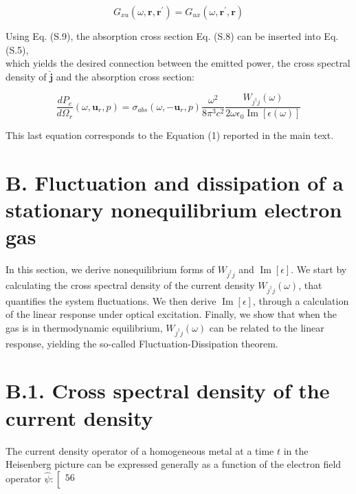 \documentclass[10pt]{article}
\begin{document}
\begin{equation*}
G_{x u}\left(\omega, \boldsymbol{r}, \boldsymbol{r}^{\prime}\right)=G_{u x}\left(\omega, \boldsymbol{r}^{\prime}, \boldsymbol{r}\right) \tag{S.9}
\end{equation*}


Using Eq. (S.9), the absorption cross section Eq. (S.8) can be inserted into Eq. (S.5),\\
which yields the desired connection between the emitted power, the cross spectral density of $\hat{\boldsymbol{j}}$ and the absorption cross section:


\begin{equation*}
\frac{d P_{e}}{d \Omega_{r}}\left(\omega, \boldsymbol{u}_{r}, p\right)=\sigma_{a b s}\left(\omega,-\boldsymbol{u}_{r}, p\right) \frac{\omega^{2}}{8 \pi^{3} c^{2}} \frac{W_{j^{\dagger} j}(\omega)}{2 \omega \epsilon_{0} \operatorname{Im}[\epsilon(\omega)]} \tag{S.10}
\end{equation*}


This last equation corresponds to the Equation (1) reported in the main text.

\section*{B. Fluctuation and dissipation of a stationary nonequilibrium electron gas}
In this section, we derive nonequilibrium forms of $W_{j^{\dagger} j}$ and $\operatorname{Im}[\epsilon]$. We start by calculating the cross spectral density of the current density $W_{j^{\dagger} j}(\omega)$, that quantifies the system fluctuations. We then derive $\operatorname{Im}[\epsilon]$, through a calculation of the linear response under optical excitation. Finally, we show that when the gas is in thermodynamic equilibrium, $W_{j^{\dagger} j}(\omega)$ can be related to the linear response, yielding the so-called Fluctuation-Dissipation theorem.

\section*{B.1. Cross spectral density of the current density}
The current density operator of a homogeneous metal at a time $t$ in the Heisenberg picture can be expressed generally as a function of the electron field operator $\hat{\psi}:\left[\begin{array}{l}56 \\ \end{array}\right.$
\end{document}
